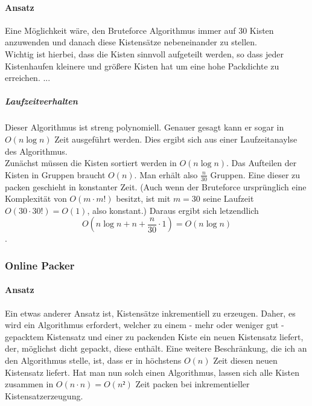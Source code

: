 \paragraph{Ansatz} Eine Möglichkeit wäre,
den Bruteforce Algorithmus immer auf 30 Kisten anzuwenden und danach diese Kistensätze nebeneinander zu stellen. \\
Wichtig ist hierbei, dass die Kisten sinnvoll aufgeteilt werden, so dass jeder Kistenhaufen kleinere und größere Kisten hat um eine hohe Packdichte zu erreichen.
...
\subparagraph{Laufzeitverhalten}
Dieser Algorithmus ist streng polynomiell. Genauer gesagt kann er sogar in $O(n \log n)$ Zeit ausgeführt werden.
Dies ergibt sich aus einer Laufzeitanaylse des Algorithmus. \\
Zunächst müssen die Kisten sortiert werden in $O(n \log n)$.
Das Aufteilen der Kisten in Gruppen braucht $O(n)$. Man erhält also $\frac{n}{30}$ Gruppen.
Eine dieser zu packen geschieht in konstanter Zeit. (Auch wenn der Bruteforce ursprünglich eine Komplexität von $O(m \cdot m!)$ besitzt,
ist mit $m=30$ seine Laufzeit $O(30 \cdot 30!) = O(1)$, also konstant.)
Daraus ergibt sich letzendlich \[ O(n\log n + n + \frac{n}{30} \cdot 1) = O(n\log n) \].
\subsubsection{Online Packer}
\paragraph{Ansatz}
Ein etwas anderer Ansatz ist, Kistensätze inkrementiell zu erzeugen.
Daher, es wird ein Algorithmus erfordert,
welcher zu einem - mehr oder weniger gut - gepacktem Kistensatz und einer zu packenden Kiste ein neuen Kistensatz liefert,
der, möglichst dicht gepackt, diese enthält.
Eine weitere Beschränkung, die ich an den Algorithmus stelle, ist, dass er in höchstens $O(n)$ Zeit diesen neuen Kistensatz liefert.
Hat man nun solch einen Algorithmus, lassen sich alle Kisten zusammen in $O(n \cdot n)=O(n²)$ Zeit packen bei inkrementieller Kistensatzerzeugung. 
